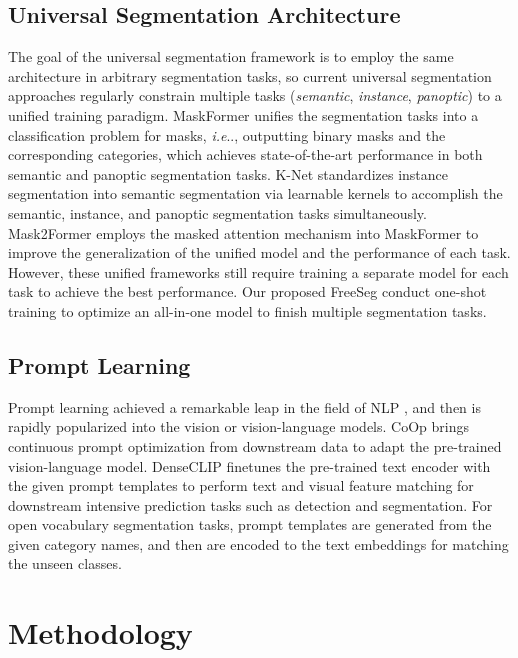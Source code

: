 \documentclass[10pt,twocolumn,letterpaper]{article}
\makeatletter
\DeclareRobustCommand\onedot{\futurelet\@let@token\@onedot}
\def\@onedot{\ifx\@let@token.\else.\null\fi\xspace}
\def\ie{\emph{i.e}\onedot} \def\Ie{\emph{I.e}\onedot}
\makeatother
\begin{document}
\subsection{Universal Segmentation Architecture}
The goal of the universal segmentation framework is to employ the same architecture in arbitrary segmentation tasks, so current universal segmentation approaches\cite{cheng2021per, zhang2021k, cheng2022masked} regularly constrain multiple tasks (\textit{semantic}, \textit{instance}, \textit{panoptic}) to a unified training paradigm.
MaskFormer\cite{cheng2021per} unifies the segmentation tasks into a classification problem for masks, \ie, outputting binary masks and the corresponding categories, which achieves state-of-the-art performance in both semantic and panoptic segmentation tasks. 
K-Net\cite{zhang2021k} standardizes instance segmentation into semantic segmentation via learnable kernels to accomplish the semantic, instance, and panoptic segmentation tasks simultaneously. Mask2Former\cite{cheng2022masked} employs the masked attention mechanism into MaskFormer to improve the generalization of the unified model and the performance of each task. However, these unified frameworks still require training a separate model for each task to achieve the best performance. Our proposed FreeSeg conduct one-shot training to optimize an all-in-one model to finish multiple segmentation tasks.

\subsection{Prompt Learning}
Prompt learning achieved a remarkable leap in the field of NLP \cite{hu2021lora, lester2021power, wei2021finetuned}, and then is rapidly popularized into the vision or vision-language models\cite{zhou2022learning, rao2022denseclip}. CoOp\cite{zhou2022learning} brings continuous prompt optimization from downstream data to adapt the pre-trained vision-language model. 
DenseCLIP\cite{rao2022denseclip} finetunes the pre-trained text encoder with the given prompt templates to perform text and visual feature matching for downstream intensive prediction tasks such as detection and segmentation. 
For open vocabulary segmentation tasks\cite{ding2022decoupling, xu2021simple}, prompt templates are generated from the given category names, and then are encoded to the text embeddings for matching the unseen classes.


\section{Methodology}
\end{document}
